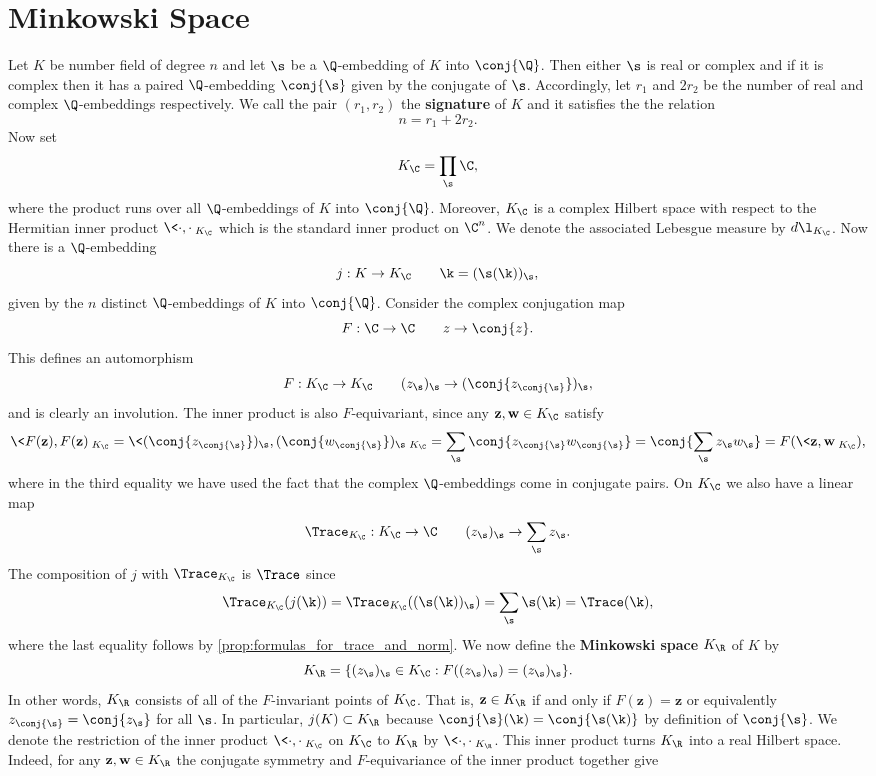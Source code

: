   \section{Minkowski Space}
    Let $K$ be number field of degree $n$ and let $\s$ be a $\Q$-embedding of $K$ into $\conj{\Q}$. Then either $\s$ is real or complex and if it is complex then it has a paired $\Q$-embedding $\conj{\s}$ given by the conjugate of $\s$. Accordingly, let $r_{1}$ and $2r_{2}$ be the number of real and complex $\Q$-embeddings respectively. We call the pair $(r_{1},r_{2})$ the \textbf{signature} of $K$ and it satisfies the the relation
    \[
      n = r_{1}+2r_{2}.
    \]
    Now set
    \[
      K_{\C} = \prod_{\s}\C,
    \]
    where the product runs over all $\Q$-embeddings of $K$ into $\conj{\Q}$. Moreover, $K_{\C}$ is a complex Hilbert space with respect to the Hermitian inner product $\<\cdot,\cdot\>_{K_{\C}}$ which is the standard inner product on $\C^{n}$. We denote the associated Lebesgue measure by $d\l_{K_{\C}}$. Now there is a $\Q$-embedding
    \[
      j:K \to K_{\C} \qquad \k = (\s(\k))_{\s},
    \]
    given by the $n$ distinct $\Q$-embeddings of $K$ into $\conj{\Q}$. Consider the complex conjugation map
    \[
      F:\C \to \C \qquad z \to \conj{z}.
    \]
    This defines an automorphism
    \[
      F:K_{\C} \to K_{\C} \qquad (z_{\s})_{\s} \to (\conj{z_{\conj{\s}}})_{\s},
    \]
    and is clearly an involution. The inner product is also $F$-equivariant, since any $\mathbf{z},\mathbf{w} \in K_{\C}$ satisfy
    \[
      \<F(\mathbf{z}),F(\mathbf{z})\>_{K_{\C}} = \<(\conj{z_{\conj{\s}}})_{\s},(\conj{w_{\conj{\s}}})_{\s}\>_{K_{\C}} = \sum_{\s}\conj{z_{\conj{\s}}w_{\conj{\s}}} = \conj{\sum_{\s}z_{\s}w_{\s}} = F(\<\mathbf{z},\mathbf{w}\>_{K_{\C}}),
    \]
    where in the third equality we have used the fact that the complex $\Q$-embeddings come in conjugate pairs. On $K_{\C}$ we also have a linear map
    \[
      \Trace_{K_{\C}}:K_{\C} \to \C \qquad (z_{\s})_{\s} \to \sum_{\s}z_{\s}.
    \]
    The composition of $j$ with $\Trace_{K_{\C}}$ is $\Trace$ since
    \[
      \Trace_{K_{\C}}(j(\k)) = \Trace_{K_{\C}}((\s(\k))_{\s}) = \sum_{\s}\s(\k) = \Trace(\k),
    \]
    where the last equality follows by \cref{prop:formulas_for_trace_and_norm}. We now define the \textbf{Minkowski space} $K_{\R}$ of $K$ by
    \[
      K_{\R} = \{(z_{\s})_{\s} \in K_{\C}:F((z_{\s})_{\s}) = (z_{\s})_{\s}\}.
    \]
    In other words, $K_{\R}$ consists of all of the $F$-invariant points of $K_{\C}$. That is, $\mathbf{z} \in K_{\R}$ if and only if $F(\mathbf{z}) = \mathbf{z}$ or equivalently $z_{\conj{\s}} = \conj{z_{\s}}$ for all $\s$. In particular, $j(K) \subset K_{\R}$ because $\conj{\s}(\k) = \conj{\s(\k)}$ by definition of $\conj{\s}$. We denote the restriction of the inner product $\<\cdot,\cdot\>_{K_{\C}}$ on $K_{\C}$ to $K_{\R}$ by $\<\cdot,\cdot\>_{K_{\R}}$. This inner product turns $K_{\R}$ into a real Hilbert space. Indeed, for any $\mathbf{z},\mathbf{w} \in K_{\R}$ the conjugate symmetry and $F$-equivariance of the inner product together give
